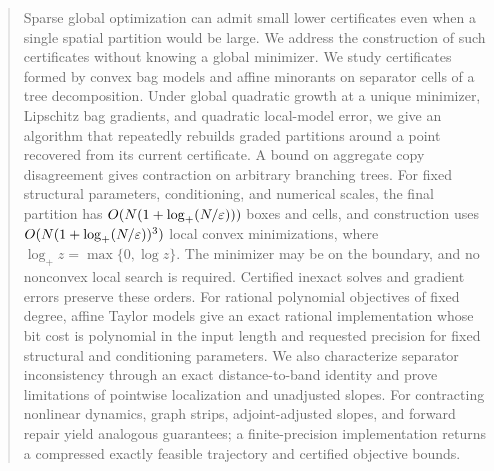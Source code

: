 \begin{abstract}
Sparse global optimization can admit small lower certificates even when a
single spatial partition would be large. We address the construction of
such certificates without knowing a global minimizer. We study
certificates formed by convex bag models and affine
minorants on separator cells of a tree decomposition. Under global
quadratic growth at a unique minimizer, Lipschitz bag gradients, and
quadratic local-model error, we give an algorithm that repeatedly rebuilds
graded partitions around a point recovered from its current certificate.
A bound on aggregate copy disagreement gives contraction on arbitrary
branching trees. For fixed structural parameters, conditioning, and
numerical scales, the final partition has $O(N(1+\log_+(N/\eps)))$ boxes
and cells, and construction uses $O(N(1+\log_+(N/\eps))^3)$ local convex
minimizations, where $\log_+z=\max\{0,\log z\}$.
The minimizer may be on the boundary, and no nonconvex local search is
required. Certified inexact solves and gradient errors preserve
these orders. For rational polynomial objectives of fixed degree, affine
Taylor models give an exact rational implementation whose bit cost is
polynomial in the input length and requested precision for fixed structural
and conditioning parameters. We also characterize separator inconsistency
through an exact distance-to-band identity and prove limitations of
pointwise localization and unadjusted slopes. For contracting nonlinear
dynamics, graph strips, adjoint-adjusted slopes, and forward repair yield
analogous guarantees; a finite-precision implementation returns a
compressed exactly feasible trajectory and certified objective bounds.
\end{abstract}
